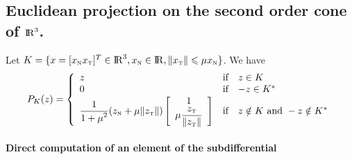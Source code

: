 \subsection{Euclidean projection on the second order cone of $\mathrm{I\!R}^3$.}
Let $K=\{x = [x_{\hbox{\tiny{N}}} x_{\hbox{\tiny{T}}}]^T \in \mathrm{I\!R}^3, x_{\hbox{\tiny{N}}} \in \mathrm{I\!R}, \|x_{{\hbox{\tiny{T}}}}\| \leqslant \mu x_{{\hbox{\tiny{N}}}}\}$. We have 
\begin{equation}
  \label{eq:proj}
  P_{K}(z) =\left\{
  \begin{array}{lcl}
    z &\text{if}& z \in K \\
    0 &\text{if}& -z \in K^* \\
    \Frac 1 {1+\mu^2}(z_\n + \mu \|z_\t\| )
    \left[\begin{array}{c}
      1 \\
      \mu \Frac {z_\t} {\|z_\t\|}
      \end{array}\right]&\text{if}& z \notin K \text{ and } -z \notin K^*
    \end{array}\right. 
  \end{equation}

\paragraph{Direct computation of an element of the subdifferential}

